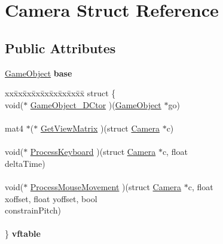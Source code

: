 \hypertarget{struct_camera}{}\section{Camera Struct Reference}
\label{struct_camera}
\subsection*{Public Attributes}
\begin{DoxyCompactItemize}
\item 
\mbox{\label{struct_camera_a0e1845f3d45181e2991a148e992c26b3}} 
\mbox{\hyperlink{struct_game_object}{Game\+Object}} {\bfseries base}
\item 
\mbox{\label{struct_camera_a00dccaa3e655f31158be5fdaaea59591}} 
\begin{tabbing}
xx\=xx\=xx\=xx\=xx\=xx\=xx\=xx\=xx\=\kill
struct \{\\
\>void($\ast$ \mbox{\hyperlink{struct_camera_acdec9e05794ea2771f97316373556a46}{GameObject\_DCtor}} )(\mbox{\hyperlink{struct_game_object}{GameObject}} $\ast$go)\\
\>\\
\>mat4 $\ast$($\ast$ \mbox{\hyperlink{struct_camera_a9bafa1f3bcffbe76cc3a602f0279cc51}{GetViewMatrix}} )(struct \mbox{\hyperlink{struct_camera}{Camera}} $\ast$c)\\
\>\\
\>void($\ast$ \mbox{\hyperlink{struct_camera_a13434f409d30054379ec14e2ad129eb7}{ProcessKeyboard}} )(struct \mbox{\hyperlink{struct_camera}{Camera}} $\ast$c, float \\
\>\>deltaTime)\\
\>\\
\>void($\ast$ \mbox{\hyperlink{struct_camera_a29dd103bc4169133d8ee899ac875e798}{ProcessMouseMovement}} )(struct \mbox{\hyperlink{struct_camera}{Camera}} $\ast$c, float \\
\>\>xoffset, float yoffset, bool \\
\>\>constrainPitch)\\
\>\\
\} {\bfseries vftable}\\


\end{tabbing}
\end{DoxyCompactItemize}
